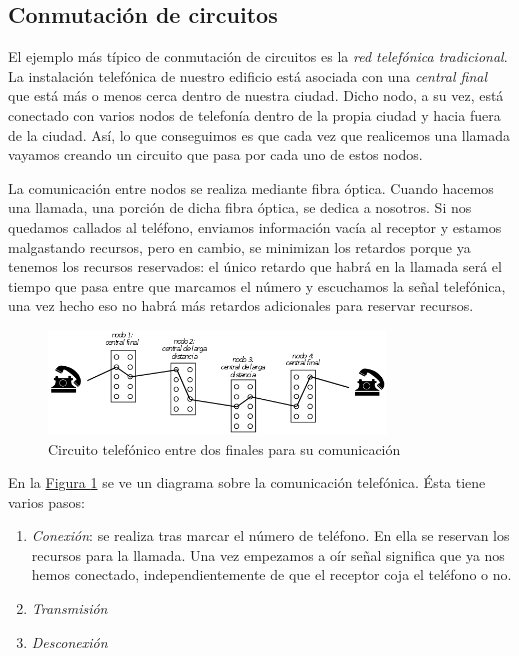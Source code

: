 \documentclass[10pt,a4paper,spanish]{report}
\begin{document}
\subsection{\textcolor{tema4}Conmutación de circuitos}
El ejemplo más típico de conmutación de circuitos es la \textit{\textcolor{tema4}{red telefónica tradicional}}. La instalación telefónica de nuestro edificio está asociada con una \textit{\textcolor{tema4}{central final}} que está más o menos cerca dentro de nuestra ciudad. Dicho nodo, a su vez, está conectado con varios nodos de telefonía dentro de la propia ciudad y hacia fuera de la ciudad. Así, lo que conseguimos es que cada vez que realicemos una llamada vayamos creando un circuito que pasa por cada uno de estos nodos.

La comunicación entre nodos se realiza mediante fibra óptica. Cuando hacemos una llamada, una porción de dicha fibra óptica, se dedica a nosotros. Si nos quedamos callados al teléfono, enviamos información vacía al receptor y estamos malgastando recursos, pero en cambio, se minimizan los retardos porque ya tenemos los recursos reservados: el único retardo que habrá en la llamada será el tiempo que pasa entre que marcamos el número y escuchamos la señal telefónica, una vez hecho eso no habrá más retardos adicionales para reservar recursos.

\begin{figure}[!h]
  \centering
  \includegraphics[width=0.8\textwidth]{circuito_telefono}
  \caption{Circuito telefónico entre dos finales para su comunicación}
  \label{circuitotlf}
\end{figure}

En la \hyperref[circuitotlf]{Figura \ref*{circuitotlf}} se ve un diagrama sobre la comunicación telefónica. Ésta tiene varios pasos:
\begin{enumerate}[1.]
  \item \textit{\textcolor{tema4}{Conexión}}: se realiza tras marcar el número de teléfono. En ella se reservan los recursos para la llamada. Una vez empezamos a oír señal significa que ya nos hemos conectado, independientemente de que el receptor coja el teléfono o no.
  \item \textit{\textcolor{tema4}{Transmisión}}
  \item \textit{\textcolor{tema4}{Desconexión}}
\end{enumerate}
\end{document}

